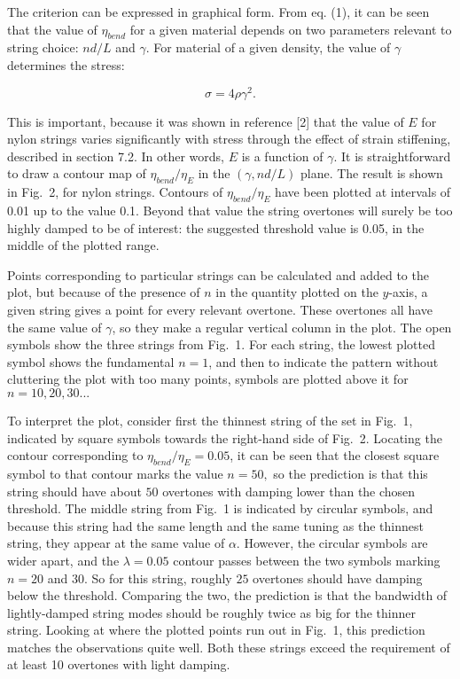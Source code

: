   The criterion can be expressed in graphical form. From eq. (1), it can be 
  seen that the value of $\eta_{bend}$ for a given material depends on two 
  parameters relevant to string choice: $nd/L$ and $\gamma$. For material of a 
  given density, the value of $\gamma$ determines the stress: 

  $$\sigma = 4 \rho \gamma^2. \tag{2}$$ 

  This is important, because it was shown in reference [2] that the value of 
  $E$ for nylon strings varies significantly with stress through the effect of 
  strain stiffening, described in section 7.2. In other words, $E$ is a 
  function of $\gamma$. It is straightforward to draw a contour map of 
  $\eta_{bend}/\eta_E$ in the $(\gamma, nd/L)$ plane. The result is shown in 
  Fig.\ 2, for nylon strings. Contours of $\eta_{bend}/\eta_E$ have been 
  plotted at intervals of 0.01 up to the value 0.1. Beyond that value the 
  string overtones will surely be too highly damped to be of interest: the 
  suggested threshold value is 0.05, in the middle of the plotted range. 

  Points corresponding to particular strings can be calculated and added to the 
  plot, but because of the presence of $n$ in the quantity plotted on the 
  $y$-axis, a given string gives a point for every relevant overtone. These 
  overtones all have the same value of $\gamma$, so they make a regular 
  vertical column in the plot. The open symbols show the three strings from 
  Fig.\ 1. For each string, the lowest plotted symbol shows the fundamental 
  $n=1$, and then to indicate the pattern without cluttering the plot with too 
  many points, symbols are plotted above it for $n=10, 20, 30...$ 

  To interpret the plot, consider first the thinnest string of the set in Fig.\ 
  1, indicated by square symbols towards the right-hand side of Fig.\ 2. 
  Locating the contour corresponding to $\eta_{bend}/\eta_E=0.05$, it can be 
  seen that the closest square symbol to that contour marks the value $n=50,$ 
  so the prediction is that this string should have about $50$ overtones with 
  damping lower than the chosen threshold. The middle string from Fig.\ 1 is 
  indicated by circular symbols, and because this string had the same length 
  and the same tuning as the thinnest string, they appear at the same value of 
  $\alpha$. However, the circular symbols are wider apart, and the 
  $\lambda=0.05$ contour passes between the two symbols marking $n= 20$ and 
  $30$. So for this string, roughly $25$ overtones should have damping below 
  the threshold. Comparing the two, the prediction is that the bandwidth of 
  lightly-damped string modes should be roughly twice as big for the thinner 
  string. Looking at where the plotted points run out in Fig.\ 1, this 
  prediction matches the observations quite well. Both these strings exceed the 
  requirement of at least 10 overtones with light damping. 

